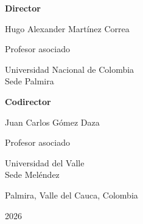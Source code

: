 \documentclass[12pt]{article}
\begin{document}
\begin{titlepage}
    \vfill

    \begin{minipage}[t]{0.42\textwidth}
        \centering
        {\small \textbf{Director} \par}
        \vspace{0.15cm}
        {\small Hugo Alexander Martínez Correa \par}
        {\footnotesize Profesor asociado \par}
        {\footnotesize Universidad Nacional de Colombia\\Sede Palmira \par}
    \end{minipage}
    \hfill
    \begin{minipage}[t]{0.42\textwidth}
        \centering
        {\small \textbf{Codirector} \par}
        \vspace{0.15cm}
        {\small Juan Carlos Gómez Daza \par}
        {\footnotesize Profesor asociado \par}
        {\footnotesize Universidad del Valle\\Sede Meléndez \par}
    \end{minipage}

    \vspace{1.2cm}

    {\small Palmira, Valle del Cauca, Colombia \par}
    \vspace{0.1cm}
    {\small 2026 \par}
    \vspace{0.4cm}

\end{titlepage}
\setcounter{page}{2} %

\newpage
\tableofcontents
{}
\listoffigures
{}
\listoftables

\newpage
{}
\setcounter{page}{1}















\newpage

\printbibliography[title={Referencias}]
\end{document}
